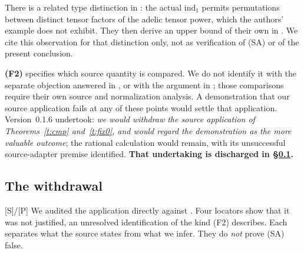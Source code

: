 \documentclass[11pt]{article}
\theoremstyle{plain}
\theoremstyle{definition}
\newcommand{\SA}{\textup{(SA)}}
\begin{document}
There is a related type distinction in
\cite[\S6.2, footnote 7]{DH}: the actual $\mathrm{ind}_1$ permits permutations between
distinct tensor factors of the adelic tensor power, which the authors'
example does not exhibit.  They then derive an upper bound of
their own in \cite[\S6.3, Lemma~6.3.1]{DH}.  We cite this observation for that distinction only, not as
verification of \SA{} or of the present conclusion.

\textbf{(F2)} specifies which source quantity is compared.  We do not
identify it with the separate objection answered in \cite[\S12]{Rpt}, or
with the argument in \cite{SS}; those comparisons require their own
source and normalization analysis.  A demonstration that our source
application fails at any of these points would settle that application.
Version~0.1.6 undertook: \emph{we would withdraw the source application of
Theorems~\ref{t:cmp} and~\ref{t:fix0}, and would regard the demonstration
as the more valuable outcome}; the rational calculation would remain, with its
unsuccessful source-adapter premise identified.  \textbf{That undertaking is
discharged in \S\ref{s:withdrawn}.}

\subsection{The withdrawal}\label{s:withdrawn}

\textup{[S]/[P]} We audited the application directly against \cite{IUT4}.  Four
locators show that it was not justified, an unresolved identification of the
kind \textup{(F2)} describes.  Each separates what the source states from what we
infer.  They do \emph{not} prove \SA{} false.
\end{document}
